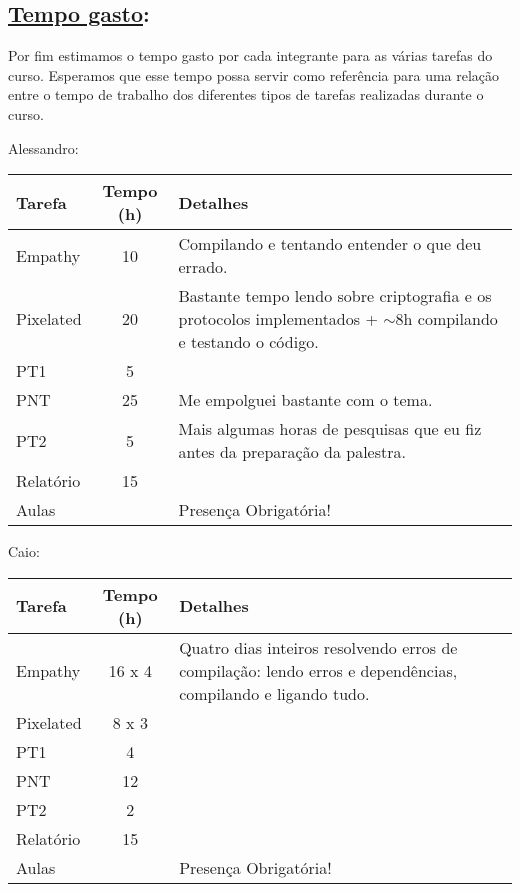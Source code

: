 \subsection*{\underline{Tempo gasto}:}

Por fim estimamos o tempo gasto por cada integrante para as várias tarefas do
curso. Esperamos que esse tempo possa servir como referência para uma relação
entre o tempo de trabalho dos diferentes tipos de tarefas realizadas durante o
curso.

Alessandro:
\begin{center}
    \begin{tabular}{ | l | c | p{7cm} |}
    \hline
    Tarefa & Tempo (h) & Detalhes \\ \hline
    Empathy & 10 & Compilando e tentando entender o que deu errado. \\ \hline
    Pixelated & 20 & Bastante tempo lendo sobre criptografia e os protocolos implementados + $\sim$8h compilando e testando o código. \\ \hline
    PT1 & 5 &  \\ \hline
    PNT & 25 & Me empolguei bastante com o tema. \\ \hline
    PT2 & 5 & Mais algumas horas de pesquisas que eu fiz antes da preparação da palestra. \\ \hline
    Relatório & 15 &  \\ \hline
    Aulas & & Presença Obrigatória! \\ \hline
    \end{tabular}
\end{center}

Caio:
\begin{center}
    \begin{tabular}{ | l | c | p{7cm} |}
    \hline
    Tarefa & Tempo (h) & Detalhes \\ \hline
    Empathy & 16 x 4 & Quatro dias inteiros resolvendo erros de compilação: lendo erros e dependências, compilando e ligando tudo. \\ \hline
    Pixelated & 8 x 3 &  \\ \hline
    PT1 & 4 &  \\ \hline
    PNT & 12 &  \\ \hline
    PT2 & 2 &  \\ \hline
    Relatório & 15 &  \\ \hline
    Aulas & & Presença Obrigatória! \\ \hline
    \end{tabular}
\end{center}

